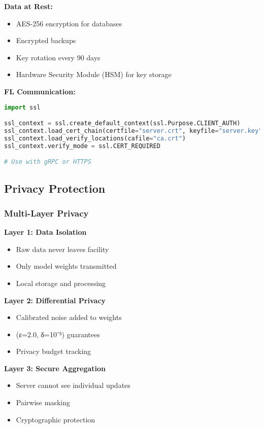 \documentclass[12pt,a4paper]{article}
\begin{document}
\textbf{Data at Rest:}
\begin{itemize}[leftmargin=1cm,itemsep=0pt]
    \item AES-256 encryption for databases
    \item Encrypted backups
    \item Key rotation every 90 days
    \item Hardware Security Module (HSM) for key storage
\end{itemize}

\textbf{FL Communication:}
\begin{lstlisting}[language=python]
import ssl

ssl_context = ssl.create_default_context(ssl.Purpose.CLIENT_AUTH)
ssl_context.load_cert_chain(certfile="server.crt", keyfile="server.key")
ssl_context.load_verify_locations(cafile="ca.crt")
ssl_context.verify_mode = ssl.CERT_REQUIRED

# Use with gRPC or HTTPS
\end{lstlisting}

\subsection{Privacy Protection}

\subsubsection{Multi-Layer Privacy}

\textbf{Layer 1: Data Isolation}
\begin{itemize}[leftmargin=1cm,itemsep=0pt]
    \item Raw data never leaves facility
    \item Only model weights transmitted
    \item Local storage and processing
\end{itemize}

\textbf{Layer 2: Differential Privacy}
\begin{itemize}[leftmargin=1cm,itemsep=0pt]
    \item Calibrated noise added to weights
    \item (ε=2.0, δ=10⁻⁵) guarantees
    \item Privacy budget tracking
\end{itemize}

\textbf{Layer 3: Secure Aggregation}
\begin{itemize}[leftmargin=1cm,itemsep=0pt]
    \item Server cannot see individual updates
    \item Pairwise masking
    \item Cryptographic protection
\end{itemize}
\end{document}
